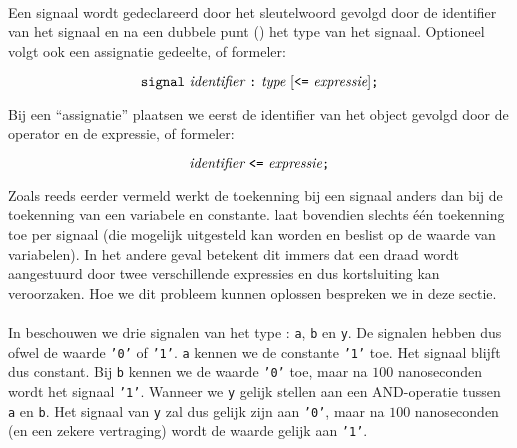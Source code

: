 \paragraph{}
Een signaal wordt gedeclareerd door het sleutelwoord  gevolgd door de identifier van het signaal en na een dubbele punt (\vhdltermen{:}) het type van het signaal. Optioneel volgt ook een assignatie gedeelte, of formeler:

\begin{equation}%
\vhdltermen{signal}\ \textit{identifier}\ \vhdltermen{:}\ \textit{type}\ [\vhdltermen{<=}\ \textit{expressie}]\vhdltermen{;}
\end{equation}

Bij een ``assignatie'' plaatsen we eerst de identifier van het object gevolgd door de \vhdltermen{<=} operator en de expressie, of formeler:

\begin{equation}%
\textit{identifier}\ \vhdltermen{<=}\ \textit{expressie}\vhdltermen{;}
\end{equation}

Zoals reeds eerder vermeld werkt de toekenning bij een signaal anders dan bij de toekenning van een variabele en constante.
\tvhdl{} laat bovendien slechts \'e\'en toekenning toe per signaal (die mogelijk uitgesteld kan worden en beslist op de waarde
van variabelen). In het andere geval betekent dit immers dat een draad wordt aangestuurd door twee verschillende expressies
en dus kortsluiting kan veroorzaken. Hoe we dit probleem kunnen oplossen bespreken we in deze sectie.

\paragraph{}

In  beschouwen we drie signalen van het type : \texttt{a}, \texttt{b} en \texttt{y}. De signalen hebben dus ofwel de waarde \texttt{'0'} of \texttt{'1'}. \texttt{a} kennen we de constante \texttt{'1'} toe. Het signaal blijft dus constant. Bij \texttt{b} kennen we de waarde \texttt{'0'} toe, maar na $100$ nanoseconden wordt het signaal \texttt{'1'}. Wanneer we \texttt{y} gelijk stellen aan een AND-operatie tussen \texttt{a} en \texttt{b}. Het signaal van \texttt{y} zal dus gelijk zijn aan \texttt{'0'}, maar na $100$ nanoseconden (en een zekere vertraging) wordt de waarde gelijk aan \texttt{'1'}.

